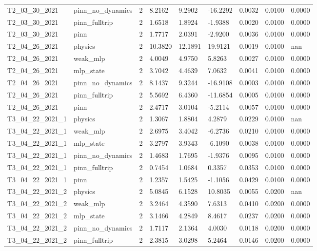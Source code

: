 \begin{table}[t]
\begin{tabular}{lllllllll}
T2\_03\_30\_2021 & pinn\_no\_dynamics & 2 & 8.2162 & 9.2902 & -16.2292 & 0.0032 & 0.0100 & 0.0000 \\
T2\_03\_30\_2021 & pinn\_fulltrip & 2 & 1.6518 & 1.8924 & -1.9388 & 0.0020 & 0.0100 & 0.0000 \\
T2\_03\_30\_2021 & pinn & 2 & 1.7717 & 2.0391 & -2.9200 & 0.0036 & 0.0100 & 0.0000 \\
T2\_04\_26\_2021 & physics & 2 & 10.3820 & 12.1891 & 19.9121 & 0.0019 & 0.0100 & nan \\
T2\_04\_26\_2021 & weak\_mlp & 2 & 4.0049 & 4.9750 & 5.8263 & 0.0027 & 0.0100 & 0.0000 \\
T2\_04\_26\_2021 & mlp\_state & 2 & 3.7042 & 4.4639 & 7.0632 & 0.0041 & 0.0100 & 0.0000 \\
T2\_04\_26\_2021 & pinn\_no\_dynamics & 2 & 8.1437 & 9.3244 & -16.9108 & 0.0003 & 0.0100 & 0.0000 \\
T2\_04\_26\_2021 & pinn\_fulltrip & 2 & 5.5692 & 6.4360 & -11.6854 & 0.0005 & 0.0100 & 0.0000 \\
T2\_04\_26\_2021 & pinn & 2 & 2.4717 & 3.0104 & -5.2114 & 0.0057 & 0.0100 & 0.0000 \\
T3\_04\_22\_2021\_1 & physics & 2 & 1.3067 & 1.8804 & 4.2879 & 0.0229 & 0.0100 & nan \\
T3\_04\_22\_2021\_1 & weak\_mlp & 2 & 2.6975 & 3.4042 & -6.2736 & 0.0210 & 0.0100 & 0.0000 \\
T3\_04\_22\_2021\_1 & mlp\_state & 2 & 3.2797 & 3.9343 & -6.1090 & 0.0038 & 0.0100 & 0.0000 \\
T3\_04\_22\_2021\_1 & pinn\_no\_dynamics & 2 & 1.4683 & 1.7695 & -1.9376 & 0.0095 & 0.0100 & 0.0000 \\
T3\_04\_22\_2021\_1 & pinn\_fulltrip & 2 & 0.7454 & 1.0684 & 0.3357 & 0.0353 & 0.0100 & 0.0000 \\
T3\_04\_22\_2021\_1 & pinn & 2 & 1.2357 & 1.5425 & -1.1056 & 0.0429 & 0.0100 & 0.0000 \\
T3\_04\_22\_2021\_2 & physics & 2 & 5.0845 & 6.1528 & 10.8035 & 0.0055 & 0.0200 & nan \\
T3\_04\_22\_2021\_2 & weak\_mlp & 2 & 3.2464 & 4.3590 & 7.6313 & 0.0410 & 0.0200 & 0.0000 \\
T3\_04\_22\_2021\_2 & mlp\_state & 2 & 3.1466 & 4.2849 & 8.4617 & 0.0237 & 0.0200 & 0.0000 \\
T3\_04\_22\_2021\_2 & pinn\_no\_dynamics & 2 & 1.7117 & 2.1364 & 4.0030 & 0.0118 & 0.0200 & 0.0000 \\
T3\_04\_22\_2021\_2 & pinn\_fulltrip & 2 & 2.3815 & 3.0298 & 5.2464 & 0.0146 & 0.0200 & 0.0000 \\

\end{tabular}
\end{table}
